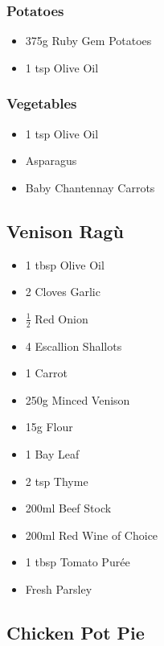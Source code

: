 \documentclass[11pt, english]{article}
\begin{document}
		\subsubsection*{Potatoes}

        \begin{itemize}
        \setlength\itemsep{0cm}
                \item 375g Ruby Gem Potatoes
		\item 1 tsp Olive Oil
        \end{itemize}

		\subsubsection*{Vegetables}

	\begin{itemize}
        \setlength\itemsep{0cm}
		\item 1 tsp Olive Oil
                \item Asparagus
		\item Baby Chantennay Carrots
        \end{itemize}

\newpage

	\subsection{Venison Rag\`{u}}

	\begin{itemize}
	\setlength\itemsep{0cm}
		\item 1 tbsp Olive Oil
		\item 2 Cloves Garlic
		\item $\frac{1}{2}$ Red Onion
		\item 4 Escallion Shallots
		\item 1 Carrot
		\item 250g Minced Venison 
		\item 15g Flour
		\item 1 Bay Leaf
		\item 2 tsp Thyme
		\item 200ml Beef Stock
		\item 200ml Red Wine of Choice
		\item 1 tbsp Tomato Pur\'{e}e 
		\item Fresh Parsley
	\end{itemize}

\newpage

	\subsection{Chicken Pot Pie}
\end{document}

